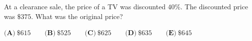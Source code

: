 At a clearance sale, the price of a TV was discounted $40\%$. The discounted price was $\$375$. What was the original price?

$\textbf{(A)}\ \$615\qquad\textbf{(B)}\ \$525\qquad\textbf{(C)}\ \$625\qquad\textbf{(D)}\ \$635\qquad\textbf{(E)}\ \$645$
